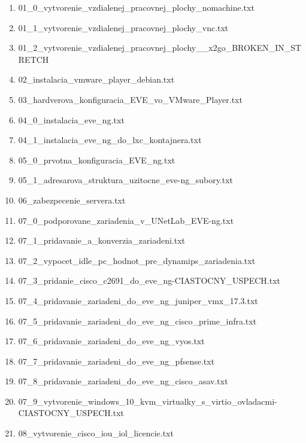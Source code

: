 \begin{enumerate}[noitemsep,label*=\thesection.\arabic*.]
\begin{enumerate}[noitemsep,label*=\arabic*.]
        \item \label{item:vnc1} 01\_0\_vytvorenie\_vzdialenej\_pracovnej\_plochy\_nomachine.txt
        \item \label{item:vnc2} 01\_1\_vytvorenie\_vzdialenej\_pracovnej\_plochy\_vnc.txt
        \item \label{item:vnc3} 01\_2\_vytvorenie\_vzdialenej\_pracovnej\_plochy\_\_x2go\_BROKEN\_IN\_STRETCH
        \item \label{item:vmware_extra_instalacia} 02\_instalacia\_vmware\_player\_debian.txt
        \item 03\_hardverova\_konfiguracia\_EVE\_vo\_VMware\_Player.txt
        \item \label{item:instalacia_ubuntu_a_eve_ng} 04\_0\_instalacia\_eve\_ng.txt
        \item 04\_1\_instalacia\_eve\_ng\_do\_lxc\_kontajnera.txt
        \item \label{item:instalacia_A_konfiguracia_eve_ng} 05\_0\_prvotna\_konfiguracia\_EVE\_ng.txt
        \item \label{item:adresarova_struktura} 05\_1\_adresarova\_struktura\_uzitocne\_eve-ng\_subory.txt
        \item \label{item:zabezpecenie} 06\_zabezpecenie\_servera.txt
        \item 07\_0\_podporovane\_zariadenia\_v\_UNetLab\_EVE-ng.txt
        \item \label{item:pridavanie_konverzia_zariadeni} 07\_1\_pridavanie\_a\_konverzia\_zariadeni.txt
        \item 07\_2\_vypocet\_idle\_pc\_hodnot\_pre\_dynamips\_zariadenia.txt
        \item 07\_3\_pridanie\_cisco\_c2691\_do\_eve\_ng-CIASTOCNY\_USPECH.txt
        \item \label{item:pridavanie_juniper_vmx} 07\_4\_pridavanie\_zariadeni\_do\_eve\_ng\_juniper\_vmx\_17.3.txt
        \item 07\_5\_pridavanie\_zariadeni\_do\_eve\_ng\_cisco\_prime\_infra.txt
        \item 07\_6\_pridavanie\_zariadeni\_do\_eve\_ng\_vyos.txt
        \item 07\_7\_pridavanie\_zariadeni\_do\_eve\_ng\_pfsense.txt
        \item \label{item:pridavanie_cisco_asav} 07\_8\_pridavanie\_zariadeni\_do\_eve\_ng\_cisco\_asav.txt
        \item \label{item:pridavanie_win} 07\_9\_vytvorenie\_windows\_10\_kvm\_virtualky\_s\_virtio\_ovladacmi-CIASTOCNY\_USPECH.txt
        \item \label{item:iou_licencia} 08\_vytvorenie\_cisco\_iou\_iol\_licencie.txt

\end{enumerate}
\end{enumerate}
